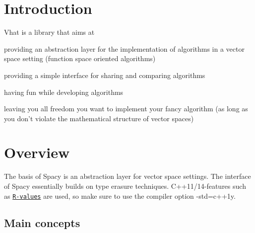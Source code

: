 \hypertarget{index_sec_intro}{}\section{\-Introduction}\label{index_sec_intro}
\-Vhat is a library that aims at
\begin{DoxyItemize}
\item providing an abstraction layer for the implementation of algorithms in a vector space setting (function space oriented algorithms)
\item providing a simple interface for sharing and comparing algorithms
\item having fun while developing algorithms
\item leaving you all freedom you want to implement your fancy algorithm (as long as you don't violate the mathematical structure of vector spaces)
\end{DoxyItemize}\hypertarget{index_sec_overview}{}\section{\-Overview}\label{index_sec_overview}
\-The basis of \-Spacy is an abstraction layer for vector space settings. \-The interface of \-Spacy essentially builds on type erasure techniques. \-C++11/14-\/features such as \href{http://en.cppreference.com/w/cpp/language/value_category}{\tt \-R-\/values} are used, so make sure to use the compiler option -\/std=c++1y.\hypertarget{index_sub_concepts}{}\subsection{\-Main concepts}\label{index_sub_concepts}

